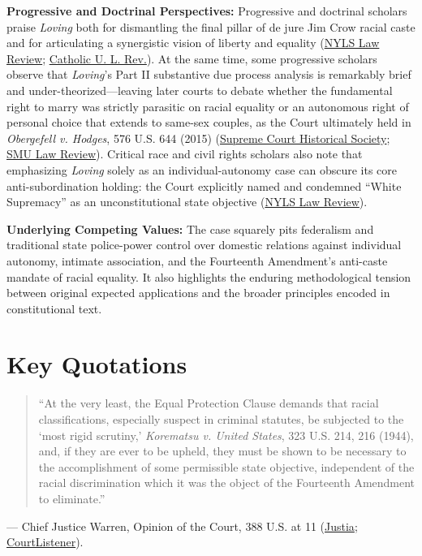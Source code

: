 \documentclass[12pt]{article}
\begin{document}
\textbf{Progressive and Doctrinal Perspectives:} Progressive and doctrinal scholars praise \textit{Loving} both for dismantling the final pillar of de jure Jim Crow racial caste and for articulating a synergistic vision of liberty and equality (\href{https://digitalcommons.nyls.edu/cgi/viewcontent.cgi?article=1091&context=nyls_law_review}{NYLS Law Review}; \href{https://scholarship.law.edu/cgi/viewcontent.cgi?article=3486&context=lawreview}{Catholic U. L. Rev.}). At the same time, some progressive scholars observe that \textit{Loving}'s Part II substantive due process analysis is remarkably brief and under-theorized---leaving later courts to debate whether the fundamental right to marry was strictly parasitic on racial equality or an autonomous right of personal choice that extends to same-sex couples, as the Court ultimately held in \textit{Obergefell v. Hodges}, 576 U.S. 644 (2015) (\href{https://civics.supremecourthistory.org/article/loving-v-virginia/}{Supreme Court Historical Society}; \href{https://scholar.smu.edu/cgi/viewcontent.cgi?article=4964&context=smulr}{SMU Law Review}). Critical race and civil rights scholars also note that emphasizing \textit{Loving} solely as an individual-autonomy case can obscure its core anti-subordination holding: the Court explicitly named and condemned ``White Supremacy'' as an unconstitutional state objective (\href{https://digitalcommons.nyls.edu/cgi/viewcontent.cgi?article=1091&context=nyls_law_review}{NYLS Law Review}).

\textbf{Underlying Competing Values:} The case squarely pits federalism and traditional state police-power control over domestic relations against individual autonomy, intimate association, and the Fourteenth Amendment's anti-caste mandate of racial equality. It also highlights the enduring methodological tension between original expected applications and the broader principles encoded in constitutional text.

\section{Key Quotations}
\begin{quote}
``At the very least, the Equal Protection Clause demands that racial classifications, especially suspect in criminal statutes, be subjected to the `most rigid scrutiny,' \textit{Korematsu v. United States}, 323 U.S. 214, 216 (1944), and, if they are ever to be upheld, they must be shown to be necessary to the accomplishment of some permissible state objective, independent of the racial discrimination which it was the object of the Fourteenth Amendment to eliminate.''
\end{quote}
\noindent --- Chief Justice Warren, Opinion of the Court, 388 U.S. at 11 (\href{https://supreme.justia.com/cases/federal/us/388/1/}{Justia}; \href{https://www.courtlistener.com/opinion/107480/loving-v-virginia/}{CourtListener}).
\end{document}
